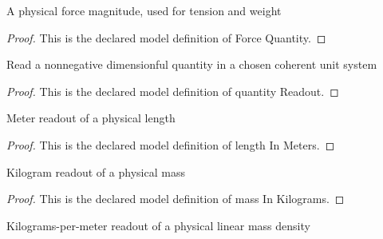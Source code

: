 \begin{definition}
  \label{def:physics:phyx-mini-0242:phyxminiproblems-problemphyxmini0242-forcequantity}
  A physical force magnitude, used for tension and weight
\end{definition}
\begin{proof}
  This is the declared model definition of Force Quantity.
\end{proof}
\begin{definition}
  \label{def:physics:phyx-mini-0242:phyxminiproblems-problemphyxmini0242-quantityreadout}
  Read a nonnegative dimensionful quantity in a chosen coherent unit system
\end{definition}
\begin{proof}
  This is the declared model definition of quantity Readout.
\end{proof}
\begin{definition}
  \label{def:physics:phyx-mini-0242:phyxminiproblems-problemphyxmini0242-lengthinmeters}
  Meter readout of a physical length
\end{definition}
\begin{proof}
  This is the declared model definition of length In Meters.
\end{proof}
\begin{definition}
  \label{def:physics:phyx-mini-0242:phyxminiproblems-problemphyxmini0242-massinkilograms}
  Kilogram readout of a physical mass
\end{definition}
\begin{proof}
  This is the declared model definition of mass In Kilograms.
\end{proof}
\begin{definition}
  \label{def:physics:phyx-mini-0242:phyxminiproblems-problemphyxmini0242-linearmassdensityinkilogramspermeter}
  Kilograms-per-meter readout of a physical linear mass density
\end{definition}
